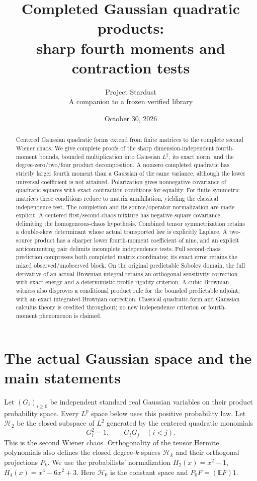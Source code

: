 \documentclass[11pt]{article}
\title{Completed Gaussian quadratic products:\protect\\
sharp fourth moments and contraction tests}
\author{Project Stardust\\\small A companion to a frozen verified library}
\date{October 30, 2026}
\newcommand{\E}{\mathbb E}
\newcommand{\Hh}{\mathcal H}
\begin{document}
\maketitle
\begin{abstract}
Centered Gaussian quadratic forms extend from finite matrices to the
complete second Wiener chaos. We give complete proofs of the sharp
dimension-independent fourth-moment bounds, bounded multiplication
into Gaussian $L^2$, its exact norm, and the degree-zero/two/four
product decomposition. A nonzero completed quadratic has strictly
larger fourth moment than a Gaussian of the same variance, although
the lower universal coefficient is not attained. Polarization gives
nonnegative covariance of quadratic squares with exact contraction
conditions for equality. For finite symmetric matrices these conditions
reduce to matrix annihilation, yielding the classical independence
test. The completion and its source/operator normalization are made
explicit. A centered first/second-chaos mixture has negative
square covariance, delimiting the homogeneous-chaos hypothesis.
Combined tensor symmetrization retains a double-skew determinant
whose actual transported law is explicitly Laplace. A two-source product
has a sharper lower fourth-moment coefficient of nine, and an explicit
anticommuting pair delimits incomplete independence tests.
Full second-chaos prediction compresses both completed matrix coordinates;
its exact error retains the mixed observed/unobserved block.
On the original predictable Sobolev domain, the full derivative of an actual Brownian integral retains an orthogonal sensitivity correction with exact energy and a deterministic-profile rigidity criterion. A cubic Brownian witness also disproves a conditional product rule for
the bounded predictable adjoint, with an exact integrated-Brownian correction.
Classical quadratic-form and Gaussian calculus theory is credited throughout;
no new independence criterion or fourth-moment phenomenon is claimed.
\end{abstract}

\section{The actual Gaussian space and the main statements}
Let $(G_i)_{i\geq0}$ be independent standard real Gaussian variables
on their product probability space. Every $L^p$ space below uses
this positive probability law. Let $\Hh_2$ be the closed subspace of
$L^2$ generated by the centered quadratic monomials
\[
 G_i^2-1,\qquad G_iG_j\quad(i<j).
\]
This is the second Wiener chaos. Orthogonality of the tensor Hermite
polynomials also defines the closed degree-$k$ spaces $\Hh_k$ and
their orthogonal projections $P_k$. We use the probabilists'
normalization $H_2(x)=x^2-1$, $H_4(x)=x^4-6x^2+3$.
Here $\Hh_0$ is the constant space and $P_0F=(\E F)1$.
\end{document}
